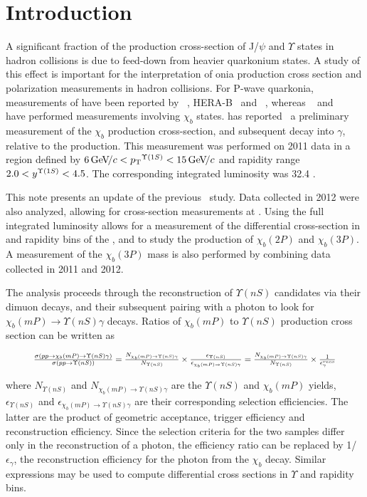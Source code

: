 \section{Introduction}
\label{sec:introduction}

A significant fraction of the production cross-section of J/$\psi$ and
$\Upsilon$ states in hadron collisions is due to feed-down from heavier
quarkonium states. A study of this effect is important for the interpretation of
onia production cross section and polarization measurements in hadron
collisions. For P-wave quarkonia, measurements of \chic have been reported by
\cdf~\cite{Abulencia:2007bra}, HERA-B~\cite{Abt:2008ed}
and \lhcb~\cite{LHCb-PAPER-2011-019}, whereas \cdf~\cite{Affolder:1999wm} and 
\atlas~\cite{Aad:2011ih} have performed measurements involving $\chi_b$ states.
\lhcb has reported~\cite{LHCb-PAPER-2012-015} a preliminary measurement of
the $\chi_b$ production cross-section, and subsequent decay into \OneS $\gamma$,
relative to the \OneS production. This measurement was performed on 2011 data
in a region defined by $6 \gevc < \pt^{\Y1S} < 15 \gevc$ and rapidity range
$2.0 < y^{\Y1S} < 4.5$.
The corresponding integrated luminosity was 32.4 \invpb.

This note presents an update of the previous \lhcb\ study. Data collected in
2012 were also analyzed, allowing for cross-section measurements at \tev.
Using the full integrated luminosity allows for a measurement of the
differential cross-section in \pt and rapidity bins of the \OneS, and to study
the production of $\chi_b(2P)$ and $\chi_b(3P)$. A measurement of the
$\chi_b(3P)$ mass is also performed by combining data collected in 2011 and
2012.

The analysis proceeds through the reconstruction of $\Upsilon(nS)$ candidates
via their dimuon decays, and their subsequent pairing with a photon to look for
$\chi_b(mP) \to \Upsilon(nS) \gamma$ decays. Ratios of $\chi_b(mP)$ to
$\Upsilon(nS)$ production cross section can be written as

\begin{equation}
\resizebox{.9\hsize}{!}{
$
    \frac{\sigma(pp \to \chi_b(mP)
    	\to \Upsilon(nS) \gamma)}{\sigma(pp \to \Upsilon(nS))} =
    \frac{N_{\chi_b(mP)\to \Upsilon(nS) \gamma}}{N_{\Upsilon(nS)}} \times \frac{\epsilon_{\Upsilon(nS)}}{\epsilon_{\chi_b(mP)\to \Upsilon(nS) \gamma}} =
    \frac{N_{\chi_b(mP)\to \Upsilon(nS) \gamma}}{N_{\Upsilon(nS)}} \times \frac{1}{\epsilon^{reco}_{\gamma}}
$
}
\end{equation}


\noindent where
${N_{\Upsilon(nS)}}$ and ${N_{\chi_b(mP)\to \Upsilon(nS) \gamma}}$ are the
$\Upsilon(nS)$ and $\chi_b(mP)$ yields, $\epsilon_{\Upsilon(nS)}$ and
$\epsilon_{\chi_b(mP)\to \Upsilon(nS) \gamma}$ are their corresponding selection
efficiencies. The latter are the product of geometric acceptance, trigger
efficiency and reconstruction efficiency. Since the selection criteria for the
two samples differ only in the reconstruction of a photon, the efficiency ratio
can be replaced by 1/$\epsilon_{\gamma}$, the reconstruction efficiency for the
photon from the $\chi_b$ decay. Similar expressions may be used to compute
differential cross sections in $\Upsilon$ \pt and rapidity bins.